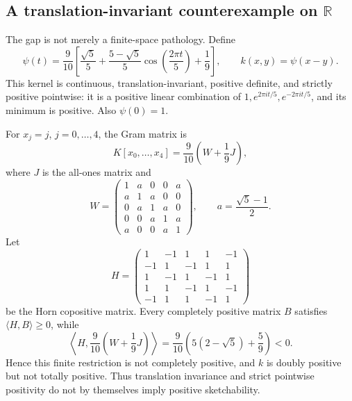 \documentclass[11pt]{article}
\newcommand{\R}{\mathbb{R}}
\theoremstyle{definition}
\theoremstyle{plain}
\theoremstyle{remark}
\begin{document}
\subsection*{A translation-invariant counterexample on \texorpdfstring{$\R$}{R}}
The gap is not merely a finite-space pathology.  Define
\[
\psi(t)=\frac{9}{10}\left[
\frac{\sqrt5}{5}
+\frac{5-\sqrt5}{5}\cos\!\left(\frac{2\pi t}{5}\right)
+\frac19\right],
\qquad
k(x,y)=\psi(x-y).
\]
This kernel is continuous, translation-invariant, positive definite, and
strictly positive pointwise: it is a positive linear combination of
$1,e^{2\pi i t/5},e^{-2\pi i t/5}$, and its minimum is positive.  Also
$\psi(0)=1$.

For $x_j=j$, $j=0,\dots,4$, the Gram matrix is
\[
K[x_0,\dots,x_4]=\frac{9}{10}\left(W+\frac19J\right),
\]
where $J$ is the all-ones matrix and
\[
W=
\begin{pmatrix}
1&a&0&0&a\\
a&1&a&0&0\\
0&a&1&a&0\\
0&0&a&1&a\\
a&0&0&a&1
\end{pmatrix},
\qquad
 a=\frac{\sqrt5-1}{2}.
\]
Let
\[
H=
\begin{pmatrix}
1&-1&1&1&-1\\
-1&1&-1&1&1\\
1&-1&1&-1&1\\
1&1&-1&1&-1\\
-1&1&1&-1&1
\end{pmatrix}
\]
be the Horn copositive matrix.  Every completely positive matrix $B$ satisfies
$\langle H,B\rangle\ge0$, while
\[
\left\langle H,\frac{9}{10}\left(W+\frac19J\right)\right\rangle
=\frac{9}{10}\left(5(2-\sqrt5)+\frac59\right)<0.
\]
Hence this finite restriction is not completely positive, and $k$ is doubly
positive but not totally positive.  Thus translation invariance and strict
pointwise positivity do not by themselves imply positive sketchability.
\end{document}
